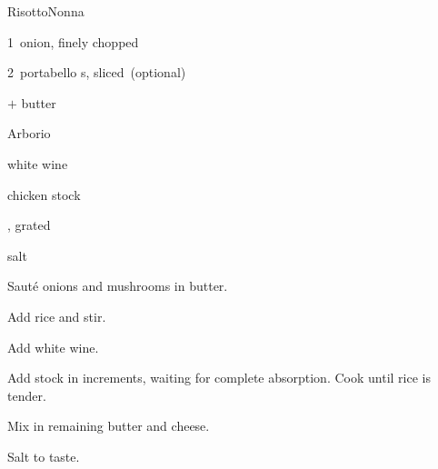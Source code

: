 \begin{recipe}{Risotto}{Nonna}{}

\begin{ingredients}
\item 1~onion, finely chopped
\item 2~portabello s, sliced~(optional)
\item {}$+$ butter
\item {} Arborio 
\item {} white wine
\item chicken stock
\item {}, grated
\item salt
\end{ingredients}

\begin{directions}
\item Sauté onions and mushrooms in  butter.
\item Add rice and stir.
\item Add white wine.
\item Add stock in \C{\half} increments, waiting for complete absorption. Cook until rice is tender.
\item Mix in remaining butter and cheese.
\item Salt to taste.
\end{directions}

\end{recipe}
